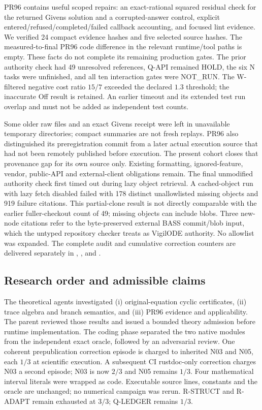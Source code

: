 \documentclass[aps,pra,reprint,onecolumn,10pt,notitlepage,nofootinbib]{revtex4-2}
\begin{document}
PR96 contains useful scoped repairs: an exact-rational squared residual check
for the returned Givens solution and a corrupted-answer control, explicit
entered/refused/completed/failed callback accounting, and focused lint evidence.
We verified 24 compact evidence hashes and five selected source hashes.
The measured-to-final PR96 code difference in the relevant runtime/tool paths
is empty. These facts do not complete its remaining production gates.
The prior authority check had 49 unresolved references, Q-API remained HOLD,
the six N tasks were unfinished, and all ten interaction gates were NOT\_RUN.
The W-filtered negative cost ratio $15/7$ exceeded the declared $1.3$ threshold;
the inaccurate Off result is retained. An earlier timeout and its extended
test run overlap and must not be added as independent test counts.

Some older raw files and an exact Givens receipt were left in unavailable
temporary directories; compact summaries are not fresh replays. PR96 also
distinguished its preregistration commit from a later actual execution source
that had not been remotely published before execution. The present cohort
closes that provenance gap for its own source only. Existing formatting,
ignored-feature, vendor, public-API and external-client obligations remain.
The final unmodified authority check first timed out during lazy object
retrieval. A cached-object run with lazy fetch disabled failed with 178
distinct unallowlisted missing objects and 919 failure citations. This
partial-clone result is not directly comparable with the earlier fuller-checkout
count of 49; missing objects can include blobs. Three new-node citations refer
to the byte-preserved external BASS commit/blob input, which the untyped
repository checker treats as VigilODE authority. No allowlist was expanded.
The complete audit and cumulative correction counters are delivered separately
in , , and
.

\subsection{Research order and admissible claims}

The theoretical agents investigated (i) original-equation cyclic certificates,
(ii) trace algebra and branch semantics, and (iii) PR96 evidence and applicability.
The parent reviewed those results and issued a bounded theory admission before
runtime implementation. The coding phase separated the two native modules
from the independent exact oracle, followed by an adversarial review.
One coherent prepublication correction episode is charged to inherited N03
and N05, each $1/3$ at scientific execution. A subsequent CI rustdoc-only
correction charges N03 a second episode; N03 is now $2/3$ and N05 remains
$1/3$. Four mathematical interval literals were wrapped as code. Executable
source lines, constants and the oracle are unchanged; no numerical campaign
was rerun.
R-STRUCT and R-ADAPT remain exhausted at $3/3$; Q-LEDGER remains $1/3$.
\end{document}
